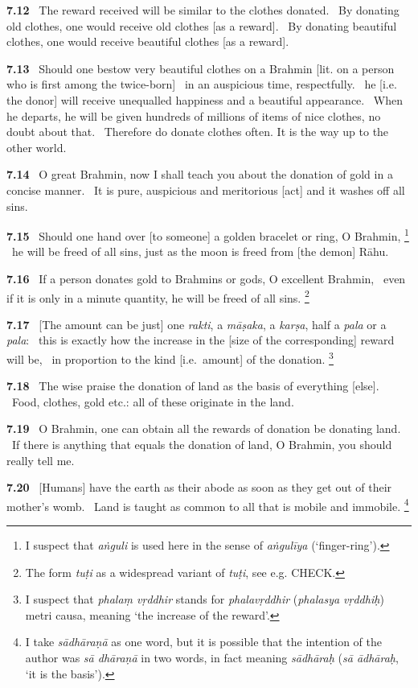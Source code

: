 \documentclass{article}
\newcommand{\skt}[1]{\textit{#1}}
\begin{document}
\textbf{7.12}%
\ The reward received will be similar to the clothes donated.%
\ By donating old clothes, one would receive old clothes [as a reward].%
\ By donating beautiful clothes, one would receive beautiful clothes [as a reward].%


\textbf{7.13}%
\ Should one bestow very beautiful clothes on a Brahmin [lit. on a person who is first among the twice-born]%
\                         in an auspicious time, respectfully.%
\ he [i.e. the donor] will receive unequalled happiness and a beautiful appearance.%
\ When he departs, he will be given hundreds of millions of items of nice clothes, no doubt about that.%
\ Therefore do donate clothes often. It is the way up to the other world.%


\textbf{7.14}%
\ O great Brahmin, now I shall teach you about the donation of gold in a concise manner.%
\ It is pure, auspicious and meritorious [act] and it washes off all sins.%


\textbf{7.15}%
\ Should one hand over [to someone] a golden bracelet or ring, O Brahmin,%
\footnote{I suspect that \skt{aṅguli} is used here in the sense of \skt{aṅgulīya} (`finger-ring'). }%
\ he will be freed of all sins, just as the moon is freed from [the demon] Rāhu.%


\textbf{7.16}%
\ If a person donates  gold to Brahmins or gods, O excellent Brahmin,%
\ even if it is only in a minute quantity, he will be freed of all sins.%
\footnote{The form \skt{tuṭi} as a widespread variant of \skt{tuṭi}, see e.g. CHECK. }%


\textbf{7.17}%
\ [The amount can be just] one \skt{rakti}, a \skt{māṣaka}, a \skt{karṣa}, half a \skt{pala} or a \skt{pala}:%
\ this is exactly how the increase in the [size of the corresponding] reward will be,%
\                                 in proportion to the kind [i.e.\ amount] of the donation.%
\footnote{I suspect that \skt{phalaṃ vṛddhir} stands for \skt{phalavṛddhir} (\skt{phalasya vṛddhiḥ}) metri causa, meaning                                `the increase of the reward'. }%


\textbf{7.18}%
\ The wise praise the donation of land as the basis of everything [else].%
\ Food, clothes, gold etc.: all of these originate in the land.%


\textbf{7.19}%
\ O Brahmin, one can obtain all the rewards of donation be donating land.%
\ If there is anything that equals the donation of land, O Brahmin, you should really tell me.%


\textbf{7.20}%
\ [Humans] have the earth as their abode as soon as they get out of their mother's womb.%
\ Land is taught as common to all that is mobile and immobile.%
\footnote{I take \skt{sādhāraṇā} as one word, but it is possible that the intention of the author                        was \skt{sā dhāraṇā} in two words, in fact meaning \skt{sādhāraḥ} (\skt{sā ādhāraḥ}, `it is the basis'). }%
\end{document}
